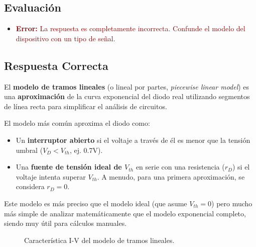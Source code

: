 \documentclass[12pt, a4paper]{article}
\newcommand{\error}[1]{\textcolor{darkred}{\textbf{Error:} #1}}
\begin{document}
\subsection*{Evaluación}
\begin{itemize}
    \item \error{La respuesta es completamente incorrecta. Confunde el modelo del dispositivo con un tipo de señal.}
\end{itemize}

\subsection*{Respuesta Correcta}
El \textbf{modelo de tramos lineales} (o lineal por partes, \textit{piecewise linear model}) es una \textbf{aproximación} de la curva exponencial del diodo real utilizando segmentos de línea recta para simplificar el análisis de circuitos.

El modelo más común aproxima el diodo como:
\begin{itemize}
    \item Un \textbf{interruptor abierto} si el voltaje a través de él es menor que la tensión umbral ($V_D < V_{th}$, ej. 0.7V).
    \item Una \textbf{fuente de tensión ideal de $V_{th}$} en serie con una resistencia ($r_D$) si el voltaje intenta superar $V_{th}$. A menudo, para una primera aproximación, se considera $r_D = 0$.
\end{itemize}
Este modelo es más preciso que el modelo ideal (que asume $V_{th}=0$) pero mucho más simple de analizar matemáticamente que el modelo exponencial completo, siendo muy útil para cálculos manuales.

\begin{figure}[h!]
    \centering
    \caption{Característica I-V del modelo de tramos lineales.}
\end{figure}
\end{document}
